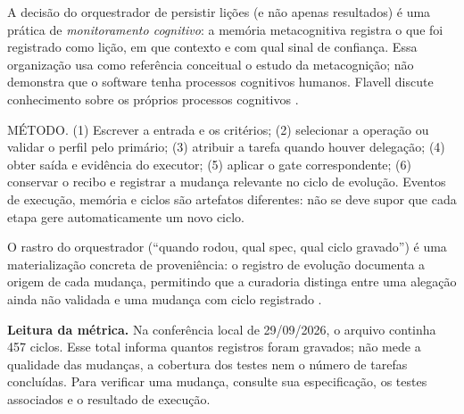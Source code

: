 A decisão do orquestrador de persistir lições (e não apenas resultados) é uma
prática de \emph{monitoramento cognitivo}: a memória metacognitiva registra o
que foi registrado como lição, em que contexto e com qual sinal de confiança.
Essa organização usa como referência conceitual o estudo da metacognição;
não demonstra que o software tenha processos cognitivos humanos. Flavell
discute conhecimento
sobre os próprios processos cognitivos .\begin{metodo}
MÉTODO. (1) Escrever a entrada e os critérios; (2) selecionar a operação ou
validar o perfil pelo primário; (3) atribuir a tarefa quando houver delegação;
(4) obter saída e evidência do executor; (5) aplicar o gate correspondente;
(6) conservar o recibo e registrar a mudança relevante no ciclo de evolução.
Eventos de execução, memória e ciclos são artefatos diferentes: não se deve
supor que cada etapa gere automaticamente um novo ciclo.
\end{metodo}

O rastro do orquestrador (``quando rodou, qual spec, qual ciclo gravado'') é
uma materialização concreta de proveniência: o registro de evolução documenta
a origem de cada mudança, permitindo que a curadoria distinga entre uma alegação
ainda não validada e uma mudança com ciclo registrado .\begin{resultado}
\textbf{Leitura da métrica.} Na conferência local de 29/09/2026, o arquivo
continha 457 ciclos. Esse total informa quantos registros foram gravados; não
mede a qualidade das mudanças, a cobertura dos testes nem o número de tarefas
concluídas. Para verificar uma mudança, consulte sua especificação, os testes
associados e o resultado de execução.
\end{resultado}

